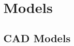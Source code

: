 \documentclass[../../main.tex]{subfiles}
\begin{document}
\chapter{Models}
\thispagestyle{fancy}







\section{CAD Models}
\blindtext
\end{document}
